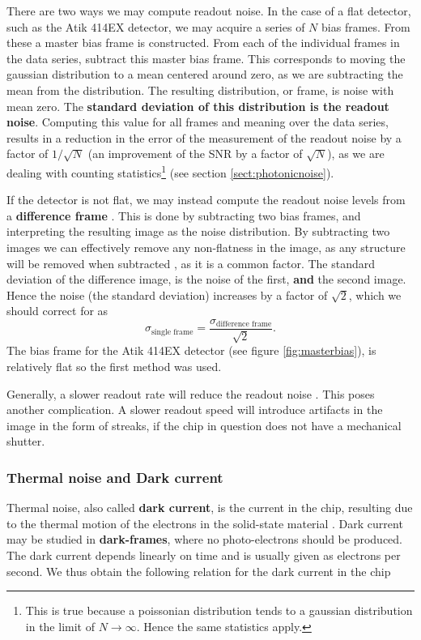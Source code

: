 \documentclass[../main.tex]{subfiles}
\begin{document}
	There are two ways we may compute readout noise. In the case of a flat detector, such as the Atik 414EX detector, we may acquire a series of $N$ bias frames. From these a master bias frame is constructed. From each of the individual frames in the data series, subtract this master bias frame. This corresponds to moving the gaussian distribution to a mean centered around zero, as we are subtracting the mean from the distribution. The resulting distribution, or frame, is noise with mean zero. The \textbf{standard deviation of this distribution is the readout noise}. Computing this value for all frames and meaning over the data series, results in a reduction in the error of the measurement of the readout noise by a factor of $1/\sqrt{N}$ (an improvement of the SNR by a factor of $\sqrt{N}$), as we are dealing with counting statistics\footnote{This is true because a poissonian distribution tends to a gaussian distribution in the limit of $N\rightarrow\infty$. Hence the same statistics apply.} (see section \ref{sect:photonicnoise}).
	
	If the detector is not flat, we may instead compute the readout noise levels from a \textbf{difference frame} \cite{obsAstMichrichReadout}. This is done by subtracting two bias frames, and interpreting the resulting image as the noise distribution. By subtracting two images we can effectively remove any non-flatness in the image, as any structure will be removed when subtracted \cite{obsAstMichrichReadout}, as it is a common factor. The standard deviation of the difference image, is the noise of the first, \textbf{and} the second image. Hence the noise (the standard deviation) increases by a factor of $\sqrt{2}$, which we should correct for as \cite{obsAstMichrichReadout}
	\begin{equation}
		\sigma_\text{single frame} = \frac{\sigma_\text{difference frame}}{\sqrt{2}} .
	\end{equation}
	The bias frame for the Atik 414EX detector (see figure \ref{fig:masterbias}), is relatively flat so the first method was used. 
	
	Generally, a slower readout rate will reduce the readout noise \cite{handbookofccdastronomy}. This poses another complication. A slower readout speed will introduce artifacts in the image in the form of streaks, if the chip in question does not have a mechanical shutter.  
	
	\subsubsection{Thermal noise and Dark current}\label{sec:dc}
	Thermal noise, also called \textbf{dark current}, is the current in the chip, resulting due to the thermal motion of the electrons in the solid-state material \cite{CCDdatareductionguide, handbookofccdastronomy}. Dark current may be studied in \textbf{dark-frames}, where no photo-electrons should be produced. The dark current depends linearly on time \cite{CCDdatareductionguide} and is usually given as electrons per second. We thus obtain the following relation for the dark current in the chip
	
\end{document}
